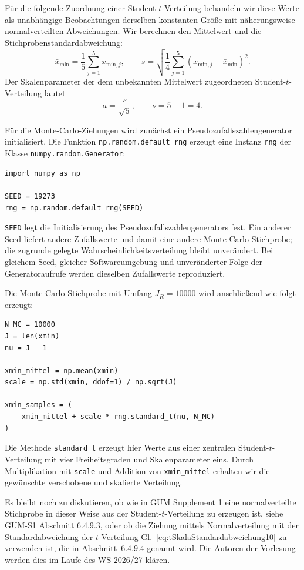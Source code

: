 Für die folgende Zuordnung einer Student-$t$-Verteilung behandeln
wir diese Werte als unabhängige Beobachtungen derselben konstanten
Größe mit näherungsweise normalverteilten Abweichungen.
Wir berechnen den Mittelwert und die Stichprobenstandardabweichung:
\begin{equation}
\bar x_\mathrm{min}
=
\frac{1}{5}\sum_{j=1}^{5}x_{\mathrm{min},j},
\qquad
s=
\sqrt{
\frac{1}{4}\sum_{j=1}^{5}
\left(x_{\mathrm{min},j}-\bar x_\mathrm{min}\right)^2
}.
\end{equation}
Der Skalenparameter der dem unbekannten Mittelwert zugeordneten
Student-$t$-Verteilung lautet
\begin{equation}
a=\frac{s}{\sqrt{5}},
\qquad
\nu=5-1=4.
\end{equation}

Für die Monte-Carlo-Ziehungen wird zunächst ein
Pseudozufallszahlengenerator initialisiert. Die Funktion
\texttt{np.random.default\_rng} erzeugt eine Instanz
\texttt{rng} der Klasse \texttt{numpy.random.Generator}:
\begin{lstlisting}[style=Python]
import numpy as np

SEED = 19273
rng = np.random.default_rng(SEED)
\end{lstlisting}

\texttt{SEED} legt die Initialisierung des
Pseudozufallszahlengenerators fest. Ein anderer Seed liefert
andere Zufallswerte und damit eine andere Monte-Carlo-Stichprobe;
die zugrunde gelegte Wahrscheinlichkeitsverteilung bleibt
unverändert. Bei gleichem Seed, gleicher Softwareumgebung und
unveränderter Folge der Generatoraufrufe werden dieselben
Zufallswerte reproduziert.

Die Monte-Carlo-Stichprobe mit Umfang $J_R=10000$ wird
anschließend wie folgt erzeugt:
\begin{lstlisting}[style=Python]
N_MC = 10000
J = len(xmin)
nu = J - 1

xmin_mittel = np.mean(xmin)
scale = np.std(xmin, ddof=1) / np.sqrt(J)

xmin_samples = (
    xmin_mittel + scale * rng.standard_t(nu, N_MC)
)
\end{lstlisting}
Die Methode \texttt{standard\_t} erzeugt hier Werte aus einer
zentralen Student-$t$-Verteilung mit vier Freiheitsgraden und
Skalenparameter eins. Durch Multiplikation mit \texttt{scale}
und Addition von \texttt{xmin\_mittel} erhalten wir die
gewünschte verschobene und skalierte Verteilung.

Es bleibt noch zu diskutieren, ob wie in GUM Supplement 1 eine normalverteilte Stichprobe in dieser Weise aus der Student-$t$-Verteilung zu erzeugen ist, siehe GUM-S1 Abschnitt 6.4.9.3, oder ob die Ziehung mittels Normalverteilung mit der Standardabweichung der $t$-Verteilung Gl.~\ref{eq:tSkalaStandardabweichung10} zu verwenden ist, die in Abschnitt~6.4.9.4 genannt wird. Die Autoren der Vorlesung werden dies im Laufe des WS 2026/27 klären.

